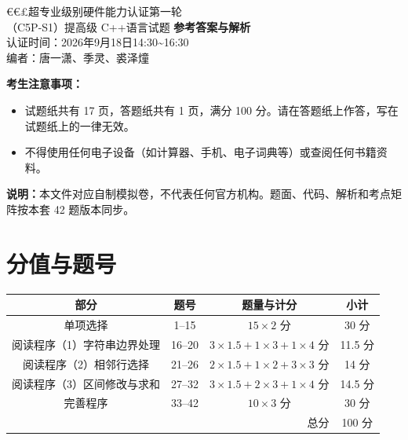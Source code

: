 \documentclass[a4paper]{ctexart}
\begin{document}
\begin{center}
{\dengxian
{\fontsize{15.95}{1} €€£超专业级别硬件能力认证第一轮}\\[1em]
{\fontsize{14.05}{1}\selectfont （C5P-S1）提高级 C++语言试题 \textbf{参考答案与解析}}\\[1em]
{\fontsize{12}{1}\selectfont 认证时间：2026年9月18日14:30\textasciitilde16:30}\\[1em]
{\fontsize{12}{1}\selectfont 编者：唐一潇、季灵、裘泽燑}
}
\end{center}

\vspace{6pt}
\noindent\textbf{考生注意事项：}
\begin{itemize}
  \item 试题纸共有 17 页，答题纸共有 1 页，满分 100 分。请在答题纸上作答，写在试题纸上的一律无效。
  \item 不得使用任何电子设备（如计算器、手机、电子词典等）或查阅任何书籍资料。
\end{itemize}

\noindent\textbf{说明：}本文件对应自制模拟卷，不代表任何官方机构。题面、代码、解析和考点矩阵按本套 42 题版本同步。

\section*{分值与题号}
\begin{center}
\begin{tabular}{c c c c}
\toprule
部分 & 题号 & 题量与计分 & 小计\\
\midrule
单项选择 & 1--15 & $15\times2$ 分 & 30 分\\
阅读程序（1）字符串边界处理 & 16--20 & $3\times1.5+1\times3+1\times4$ 分 & 11.5 分\\
阅读程序（2）相邻行选择 & 21--26 & $2\times1.5+1\times2+3\times3$ 分 & 14 分\\
阅读程序（3）区间修改与求和 & 27--32 & $3\times1.5+2\times3+1\times4$ 分 & 14.5 分\\
完善程序 & 33--42 & $10\times3$ 分 & 30 分\\
\midrule
\multicolumn{3}{r}{总分} & 100 分\\
\bottomrule
\end{tabular}
\end{center}
\end{document}
